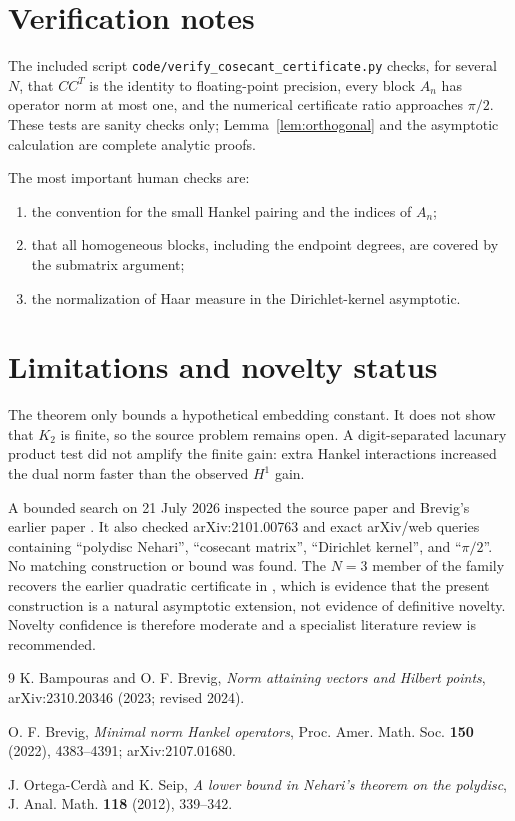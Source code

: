 \documentclass[11pt]{article}
\begin{document}
\section{Verification notes}

The included script \texttt{code/verify\_cosecant\_certificate.py} checks, for
several $N$, that $CC^T$ is the identity to floating-point precision, every
block $A_n$ has operator norm at most one, and the numerical certificate ratio
approaches $\pi/2$.  These tests are sanity checks only; Lemma~\ref{lem:orthogonal}
and the asymptotic calculation are complete analytic proofs.

The most important human checks are:
\begin{enumerate}
 \item the convention for the small Hankel pairing and the indices of $A_n$;
 \item that all homogeneous blocks, including the endpoint degrees, are
 covered by the submatrix argument;
 \item the normalization of Haar measure in the Dirichlet-kernel asymptotic.
\end{enumerate}

\section{Limitations and novelty status}

The theorem only bounds a hypothetical embedding constant.  It does not show
that $K_2$ is finite, so the source problem remains open.  A digit-separated
lacunary product test did not amplify the finite gain: extra Hankel
interactions increased the dual norm faster than the observed $H^1$ gain.

A bounded search on 21 July 2026 inspected the source paper and Brevig's
earlier paper \cite{Brevig}.  It also checked arXiv:2101.00763 and exact
arXiv/web queries containing ``polydisc Nehari'', ``cosecant matrix'',
``Dirichlet kernel'', and ``$\pi/2$''.  No matching construction or bound was
found.  The $N=3$ member
of the family recovers the earlier quadratic certificate in \cite{Brevig},
which is evidence that the present construction is a natural asymptotic
extension, not evidence of definitive novelty.  Novelty confidence is
therefore moderate and a specialist literature review is recommended.

\begin{thebibliography}{9}
K. Bampouras and O. F. Brevig,
\emph{Norm attaining vectors and Hilbert points},
arXiv:2310.20346 (2023; revised 2024).

O. F. Brevig,
\emph{Minimal norm Hankel operators},
Proc. Amer. Math. Soc. \textbf{150} (2022), 4383--4391;
arXiv:2107.01680.

J. Ortega-Cerd\`a and K. Seip,
\emph{A lower bound in Nehari's theorem on the polydisc},
J. Anal. Math. \textbf{118} (2012), 339--342.
\end{thebibliography}
\end{document}
